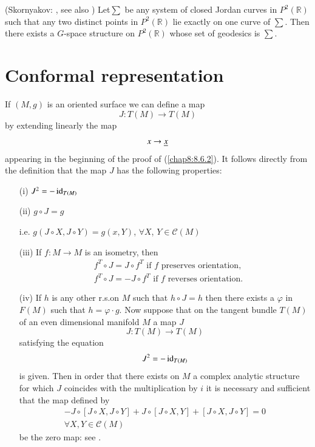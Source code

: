 \begin{theorem*}(Skornyakov: \cite{28}, see also   \cite{8})
Let\pageoriginale $\sum$ be any system of closed Jordan curves in
$P^{2}(\mathbb{R})$ such that any two distinct points in
$P^{2}(\mathbb{R})$ lie exactly on one curve of $\sum$. Then there
exists a $G$-space structure on $P^{2}(\mathbb{R})$ whose set of
geodesics is $\sum$.
\end{theorem*}

\section{Conformal representation}\label{chap8:sec11}

If $(M,g)$ is an oriented surface we can define a map
$$
J:T(M)\to T(M)
$$
by extending linearly the map
$$
x\to \underline{x}
$$
appearing in the beginning of the proof of (\ref{chap8:8.6.2}). It
follows directly from the definition that the map $J$ has the
following properties:
\begin{itemize}
\item[(i)] $J^{2}=-\operatorname{id}_{T(M)}$

\item[(ii)] $g\circ J=g$

i.e. $g(J\circ X,J\circ Y)=g(x,Y)$, $\forall X$, $Y\in \mathscr{C}(M)$

\item[(iii)] If $f:M\to M$ is an isometry, then
\begin{align*}
& f^{T}\circ J=J\circ f^{T} \text{ \ if $f$ preserves orientation,}\\
& f^{T}\circ J=-J\circ f^{T}\text{ \ if $f$ reverses orientation.}
\end{align*}

\item[(iv)] If $h$ is any other r.s.\@ on $M$ such that $h\circ J=h$
  then there exists a $\varphi$ in $F(M)$ such that $h=\varphi\cdot
  g$. Now suppose that on the tangent bundle $T(M)$ of an even
  dimensional manifold $M$ a map $J$
$$
J:T(M)\to T(M)
$$
satisfying \pageoriginale the equation
$$
J^{2}=-\operatorname{id}_{T(M)}
$$
is given. Then in order that there exists on $M$ a complex analytic
structure for which $J$ coincides with the multiplication by $i$ it is
necessary and sufficient that the map defined by
\begin{gather*}
[X,Y]-J\circ [J\circ X,J\circ Y]+J\circ[J\circ X,Y]+[J\circ X,J\circ
  Y]=0\\
\forall X, Y\in\mathscr{C}(M)
\end{gather*}
be the zero map: see \cite{23}.
\end{itemize}

